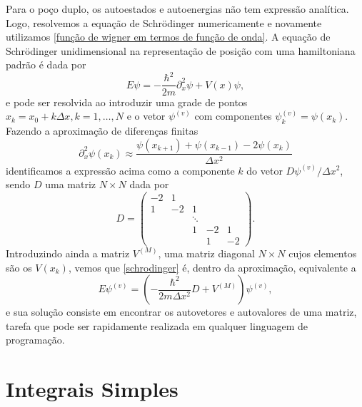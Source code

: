 \documentclass[
	12pt,
	oneside,			%
	a4paper,			%
	english,			%
	brazil				%
	]{abntex2}
\theoremstyle{definition}
\begin{document}
\begin{apendicesenv}
Para o poço duplo, os autoestados e autoenergias não tem expressão analítica. Logo, resolvemos a equação de Schrödinger numericamente e novamente utilizamos \eqref{função de wigner em termos de função de onda}. A equação de Schrödinger unidimensional na representação de posição com uma hamiltoniana padrão é dada por
\begin{equation}
\label{schrodinger}
    E \psi = -\frac{\hbar^2}{2m} \partial_x^2 \psi + V(x) \psi,
\end{equation}
e pode ser resolvida ao introduzir uma grade de pontos $x_k = x_0 + k \Delta x, k = 1,\ldots,N$ e o vetor $\psi^{(v)}$ com componentes $\psi^{(v)}_k = \psi(x_k)$. Fazendo a aproximação de diferenças finitas
\begin{equation}
    \partial_x^2 \psi(x_k) \approx \frac{\psi(x_{k+1}) + \psi(x_{k-1})-2 \psi(x_{k})}{\Delta x^2}
\end{equation}
identificamos a expressão acima como a componente $k$ do vetor $D \psi^{(v)}/\Delta x^2$, sendo $D$ uma matriz $N \times N$ dada por
\begin{equation}
    D = \begin{pmatrix}
    -2 & 1 & & & \\
    1 & -2 & 1 & & \\
    & & \ddots & & \\
    & & 1 & -2 & 1 \\
    & & & 1 & -2
  \end{pmatrix}.
\end{equation}
Introduzindo ainda a matriz $V^{(M)}$, uma matriz diagonal $N \times N$ cujos elementos são os $V(x_k)$, vemos que \eqref{schrodinger} é, dentro da aproximação, equivalente a
\begin{equation}
    E \psi^{(v)} = \left( -\frac{\hbar^2}{2m \Delta x^2} D + V^{(M)} \right) \psi^{(v)},
\end{equation}
e sua solução consiste em encontrar os autovetores e autovalores de uma matriz, tarefa que pode ser rapidamente realizada em qualquer linguagem de programação.


\section{Integrais Simples}


\end{apendicesenv}
\end{document}
